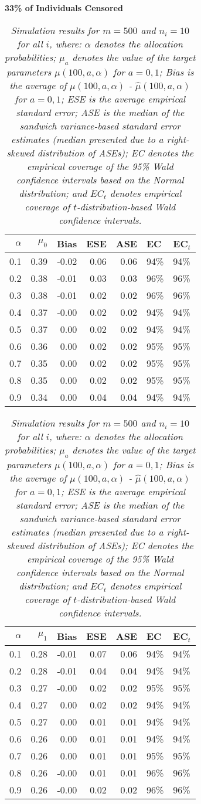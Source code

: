 \documentclass[12pt, letterpaper]{article}
\begin{document}
\begin{center}
	\textbf{33\% of Individuals Censored} 
\end{center}
\begin{table}[ht!]
	\centering
	\bgroup
	\def\arraystretch{1.25}
	\setlength\tabcolsep{0.05in}
	\begin{tabular}{rrrrrll}
		\hline
		$\alpha$ & $\mu_0$ & Bias & ESE & ASE & EC & EC$_t$ \\ \hline
		0.1 & 0.39 & -0.02 & 0.06 & 0.06 & 94\% & 94\% \\ 
		0.2 & 0.38 & -0.01 & 0.03 & 0.03 & 96\% & 96\% \\ 
		0.3 & 0.38 & -0.01 & 0.02 & 0.02 & 96\% & 96\% \\ 
		0.4 & 0.37 & -0.00 & 0.02 & 0.02 & 94\% & 94\% \\ 
		0.5 & 0.37 & 0.00 & 0.02 & 0.02 & 94\% & 94\% \\ 
		0.6 & 0.36 & 0.00 & 0.02 & 0.02 & 95\% & 95\% \\ 
		0.7 & 0.35 & 0.00 & 0.02 & 0.02 & 95\% & 95\% \\ 
		0.8 & 0.35 & 0.00 & 0.02 & 0.02 & 95\% & 95\% \\ 
		0.9 & 0.34 & 0.00 & 0.04 & 0.04 & 94\% & 94\% \\ 
		\hline
	\end{tabular}
	\egroup
	\quad 
	\bgroup
	\setlength\tabcolsep{0.05in}
	\def\arraystretch{1.25}
	\begin{tabular}{rrrrrll}
		\hline
		$\alpha$ & $\mu_1$ & Bias & ESE & ASE & EC & EC$_t$ \\ \hline
		0.1 & 0.28 & -0.01 & 0.07 & 0.06 & 94\% & 94\% \\ 
		0.2 & 0.28 & -0.01 & 0.04 & 0.04 & 94\% & 94\% \\ 
		0.3 & 0.27 & -0.00 & 0.02 & 0.02 & 95\% & 95\% \\ 
		0.4 & 0.27 & 0.00 & 0.02 & 0.02 & 94\% & 94\% \\ 
		0.5 & 0.27 & 0.00 & 0.01 & 0.01 & 94\% & 94\% \\ 
		0.6 & 0.26 & 0.00 & 0.01 & 0.01 & 94\% & 94\% \\ 
		0.7 & 0.26 & 0.00 & 0.01 & 0.01 & 95\% & 95\% \\ 
		0.8 & 0.26 & -0.00 & 0.01 & 0.01 & 96\% & 96\% \\ 
		0.9 & 0.26 & -0.00 & 0.02 & 0.02 & 96\% & 96\% \\ 
		\hline
	\end{tabular}
	\egroup
	\caption*{\textit{Simulation results for $m = 500$ and $n_i = 10$ for all $i$, where: $\alpha$ denotes the allocation probabilities; $\mu_a$ denotes the value of the target parameters $\mu(100, a, \alpha)$ for $a=0,1$; Bias is the average of $\mu(100, a, \alpha)$ - $\hat{\mu}(100, a, \alpha)$ for $a=0, 1$; ESE is the average empirical standard error; ASE is the median of the sandwich variance-based standard error estimates (median presented due to a right-skewed distribution of ASEs); EC denotes the empirical coverage of the 95\% Wald confidence intervals based on the Normal distribution; and $EC_t$ denotes empirical coverage of $t$-distribution-based Wald confidence intervals.} \\
	
}
\end{table}
\end{document}
